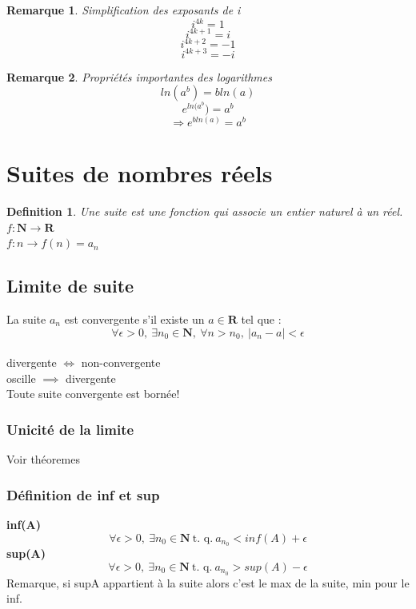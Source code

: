 \documentclass{article}
\newtheorem{definition}{Definition}[section]
\newtheorem{remark}{Remarque}[section]
\begin{document}
\begin{remark}
Simplification des exposants de i
    \[ i^{4k} = 1 \]
    \[ i^{4k+1} = i \]
    \[ i^{4k+2} = -1 \] 
    \[ i^{4k+3} = -i \]
\end{remark}
\begin{remark}
Propriétés importantes des logarithmes
    \[ ln(a^{b}) = bln(a) \]
    \[ e^{ln(a^{b}}) = a^{b} \]
    \[ \Rightarrow e^{bln(a)} = a^{b} \]
\end{remark}

\section{Suites de nombres réels}

\begin{definition}
Une suite est une fonction qui associe un entier naturel à un réel. \\
    $ f : \mathbf{N} \rightarrow \mathbf{R} $ \\
    $ f : n \rightarrow f(n) = a_n $
\end{definition}

\subsection{Limite de suite}

La suite $ a_n $ est convergente s'il existe un $ a \in \mathbf{R} $ tel que : \\
\[ \forall \epsilon > 0,\ \exists n_0 \in \mathbf{N},\ \forall n > n_0,\ |a_n - a| < \epsilon \]\\
divergente $ \Leftrightarrow $ non-convergente\\
oscille $ \implies $ divergente \\
Toute suite convergente est bornée!
\subsubsection{Unicité de la limite}
Voir théoremes

\subsubsection{Définition de inf et sup}

\textbf{inf(A)}\\
\[ \forall \epsilon > 0,\ \exists n_0 \in \mathbf{N}\ \text{t. q.}\ a_{n_0} < inf(A) + \epsilon \]
\textbf{sup(A)}\\
\[ \forall \epsilon > 0,\ \exists n_0 \in \mathbf{N}\ \text{t. q.}\ a_{n_0} > sup(A) - \epsilon \]
Remarque, si supA appartient à la suite alors c'est le max de la suite, min pour le inf.
\end{document}
